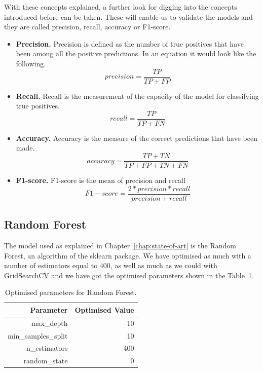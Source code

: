 With these concepts explained, a further look for digging into the concepts introduced before can be taken. These will enable us to validate the models and they are called precision, recall, accuracy or F1-score.

\begin{itemize}
    \item \textbf{Precision.} Precision is defined as the number of true positives that have been among all the positive predictions. In an equation it would look like the following.
    \begin{equation}
        precision = \frac{TP}{TP + FP} 
    \end{equation}
    \item \textbf{Recall.} Recall is the measurement of the capacity of the model for classifying true positives.
    \begin{equation}
        recall = \frac{TP}{TP + FN} 
    \end{equation}
    \item \textbf{Accuracy.} Accuracy is the measure of the correct predictions that have been made.
    \begin{equation}
        accuracy = \frac{TP + TN}{TP + FP + TN + FN} 
    \end{equation}
    \item \textbf{F1-score.} F1-score is the mean of precision and recall
    \begin{equation}
        F1-score = \frac{2 * precision * recall}{precision + recall} 
    \end{equation}
    
\end{itemize}

\subsection{Random Forest}
The model used as explained in Chapter~\ref{chap:state-of-art} is the Random Forest, an algorithm of the sklearn package. We have optimised as much with a number of estimators equal to 400, as well as much as we could with GridSearchCV and we have got the optimised parameters shown in the Table~\ref{tab:RFoptimisedparams}.


\begin{table}[htp]
\centering
\begin{tabular}{|r|r|}
\hline
\textbf{Parameter}  & \textbf{Optimised Value} \\ \hline
max\_depth          & 10                       \\ \hline
min\_samples\_split & 10                       \\ \hline
n\_estimators       & 400                      \\ \hline
random\_state       & 0                        \\ \hline
\end{tabular}
\caption{Optimised parameters for Random Forest.}
\label{tab:RFoptimisedparams}
\end{table}

